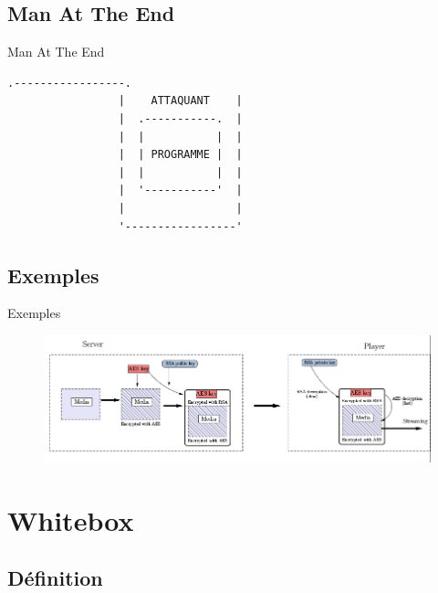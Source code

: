 \documentclass{beamer}
\begin{document}
\subsection{Man At The End}

\begin{frame}[fragile]{Man At The End}

\begin{Verbatim}[samepage=true]
                 .-----------------. 
                 |    ATTAQUANT    |
                 |  .-----------.  |  
                 |  |           |  |  
                 |  | PROGRAMME |  | 
                 |  |           |  | 
                 |  '-----------'  |
                 |                 |
                 '-----------------'
\end{Verbatim}
\end{frame}

\subsection{Exemples}

\begin{frame}{Exemples}

 \begin{figure}[h]
    \centering
    \includegraphics[scale=0.50]{./images/drms.png}
  \end{figure}

\end{frame}

\section{Whitebox}

\subsection{Définition}
\end{document}
